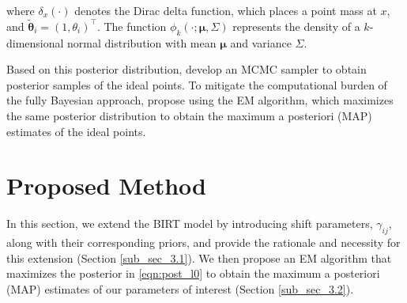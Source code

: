 \documentclass[11pt]{article}
\begin{document}
where $ \delta_x(\cdot) $ denotes the Dirac delta function, which places a point mass at $ x $, and $\boldsymbol{\boldsymbol{\tilde{\theta}}}_i = (1, \theta_i)^\top$. The function $ \phi_k(\cdot ; \boldsymbol{\mu}, \Sigma) $ represents the density of a $ k $-dimensional normal distribution with mean $ \boldsymbol{\mu} $ and variance  $ \Sigma $.  

Based on this posterior distribution, \cite{Clinton2004} develop an MCMC sampler to obtain posterior samples of the ideal points. To mitigate the computational burden of the fully Bayesian approach, \cite{Imai2016} propose using the EM algorithm, which maximizes the same posterior distribution to obtain the maximum a posteriori (MAP) estimates of the ideal points.

\section{Proposed Method}\label{sec_3}
In this section, we extend the BIRT model by introducing shift parameters, $\gamma_{ij}$, along with their corresponding priors, and provide the rationale and necessity for this extension (Section \ref{sub_sec_3.1}). We then propose an EM algorithm that maximizes the posterior in \eqref{eqn:post_l0}  to obtain the maximum a posteriori (MAP) estimates of our parameters of interest (Section \ref{sub_sec_3.2}).


\end{document}
